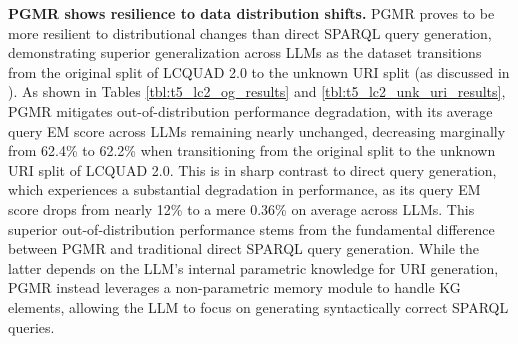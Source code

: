 \noindent \textbf{PGMR shows resilience to data distribution shifts.}
PGMR proves to be more resilient to distributional changes than direct SPARQL query generation, demonstrating superior generalization across LLMs as the dataset transitions from the original split of LCQUAD 2.0 to the unknown URI split (as discussed in ).
As shown in Tables \ref{tbl:t5_lc2_og_results} and \ref{tbl:t5_lc2_unk_uri_results}, PGMR  mitigates out-of-distribution performance degradation, with its average query EM score across LLMs remaining nearly unchanged, decreasing marginally from 62.4\% to 62.2\% when transitioning from the original split to the unknown URI split of LCQUAD 2.0.
This is in sharp contrast to direct query generation, which experiences a substantial degradation in performance, as its query EM score drops from nearly 12\% to a mere 0.36\% on average across LLMs.
This superior out-of-distribution performance stems from the fundamental difference between PGMR and traditional direct SPARQL query generation. While the latter depends on the LLM’s internal parametric knowledge for URI generation, PGMR instead leverages a non-parametric memory module to handle KG elements, allowing the LLM to focus on generating syntactically correct SPARQL queries.



